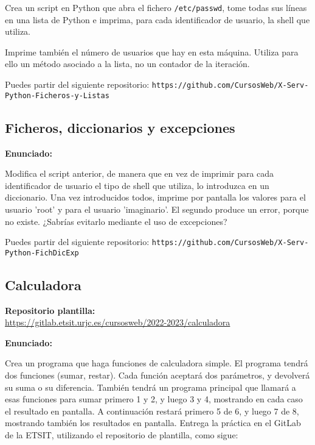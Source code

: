 Crea un script en Python que abra el fichero \verb|/etc/passwd|, tome todas sus líneas en una lista de Python e imprima, para cada identificador de usuario, la shell que utiliza.

Imprime también el número de usuarios que hay en esta máquina. Utiliza para
ello un método asociado a la lista, no un contador de la iteración.

Puedes partir del siguiente repositorio: \verb|https://github.com/CursosWeb/X-Serv-Python-Ficheros-y-Listas|

\subsection{Ficheros, diccionarios y excepciones}
\label{subsec:ficheros-dic-excep}

\textbf{Enunciado:}

Modifica el script
anterior, de manera que en vez de imprimir para cada identificador de usuario el tipo
de shell que utiliza, lo introduzca en un diccionario. Una vez introducidos todos, imprime por pantalla los valores para el usuario 'root' y para el
usuario 'imaginario'. El segundo produce un error, porque no existe. ¿Sabrías evitarlo mediante el uso de
excepciones?

Puedes partir del siguiente repositorio: \verb|https://github.com/CursosWeb/X-Serv-Python-FichDicExp|

\subsection{Calculadora}
\label{subsec:calculadora}

\textbf{Repositorio plantilla:} \\
\url{https://gitlab.etsit.urjc.es/cursosweb/2022-2023/calculadora}

\textbf{Enunciado:}

Crea un programa que haga funciones de calculadora simple. El programa tendrá dos funciones (sumar, restar). Cada función aceptará dos parámetros, y devolverá su suma o su diferencia. También tendrá un programa principal que llamará a esas funciones para sumar primero 1 y 2, y luego 3 y 4, mostrando en cada caso el resultado en pantalla. A continuación restará primero 5 de 6, y luego 7 de 8, mostrando también los resultados en pantalla. Entrega la práctica en el GitLab de la ETSIT, utilizando el repositorio de plantilla, como sigue:

